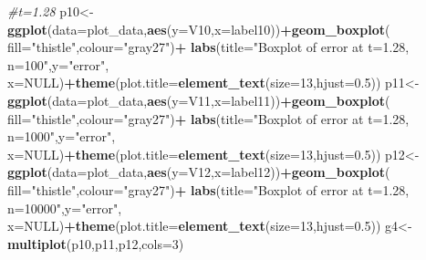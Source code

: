 \documentclass[
]{article}
\newenvironment{Shaded}{\begin{snugshade}}{\end{snugshade}}
\newcommand{\CommentTok}[1]{\textcolor[rgb]{0.56,0.35,0.01}{\textit{#1}}}
\newcommand{\DataTypeTok}[1]{\textcolor[rgb]{0.13,0.29,0.53}{#1}}
\newcommand{\DecValTok}[1]{\textcolor[rgb]{0.00,0.00,0.81}{#1}}
\newcommand{\FloatTok}[1]{\textcolor[rgb]{0.00,0.00,0.81}{#1}}
\newcommand{\KeywordTok}[1]{\textcolor[rgb]{0.13,0.29,0.53}{\textbf{#1}}}
\newcommand{\NormalTok}[1]{#1}
\newcommand{\OperatorTok}[1]{\textcolor[rgb]{0.81,0.36,0.00}{\textbf{#1}}}
\newcommand{\OtherTok}[1]{\textcolor[rgb]{0.56,0.35,0.01}{#1}}
\newcommand{\StringTok}[1]{\textcolor[rgb]{0.31,0.60,0.02}{#1}}
\begin{document}
\begin{Shaded}
\begin{Highlighting}[]
\CommentTok{#t=1.28}
\NormalTok{p10<-}\KeywordTok{ggplot}\NormalTok{(}\DataTypeTok{data=}\NormalTok{plot_data,}\KeywordTok{aes}\NormalTok{(}\DataTypeTok{y=}\NormalTok{V10,}\DataTypeTok{x=}\NormalTok{label10))}\OperatorTok{+}\KeywordTok{geom_boxplot}\NormalTok{(}
  \DataTypeTok{fill=}\StringTok{"thistle"}\NormalTok{,}\DataTypeTok{colour=}\StringTok{"gray27"}\NormalTok{)}\OperatorTok{+}
\StringTok{  }\KeywordTok{labs}\NormalTok{(}\DataTypeTok{title=}\StringTok{"Boxplot of error at t=1.28, n=100"}\NormalTok{,}\DataTypeTok{y=}\StringTok{"error"}\NormalTok{,}
       \DataTypeTok{x=}\OtherTok{NULL}\NormalTok{)}\OperatorTok{+}\KeywordTok{theme}\NormalTok{(}\DataTypeTok{plot.title=}\KeywordTok{element_text}\NormalTok{(}\DataTypeTok{size=}\DecValTok{13}\NormalTok{,}\DataTypeTok{hjust=}\FloatTok{0.5}\NormalTok{))}
\NormalTok{p11<-}\KeywordTok{ggplot}\NormalTok{(}\DataTypeTok{data=}\NormalTok{plot_data,}\KeywordTok{aes}\NormalTok{(}\DataTypeTok{y=}\NormalTok{V11,}\DataTypeTok{x=}\NormalTok{label11))}\OperatorTok{+}\KeywordTok{geom_boxplot}\NormalTok{(}
  \DataTypeTok{fill=}\StringTok{"thistle"}\NormalTok{,}\DataTypeTok{colour=}\StringTok{"gray27"}\NormalTok{)}\OperatorTok{+}
\StringTok{  }\KeywordTok{labs}\NormalTok{(}\DataTypeTok{title=}\StringTok{"Boxplot of error at t=1.28, n=1000"}\NormalTok{,}\DataTypeTok{y=}\StringTok{"error"}\NormalTok{,}
       \DataTypeTok{x=}\OtherTok{NULL}\NormalTok{)}\OperatorTok{+}\KeywordTok{theme}\NormalTok{(}\DataTypeTok{plot.title=}\KeywordTok{element_text}\NormalTok{(}\DataTypeTok{size=}\DecValTok{13}\NormalTok{,}\DataTypeTok{hjust=}\FloatTok{0.5}\NormalTok{))}
\NormalTok{p12<-}\KeywordTok{ggplot}\NormalTok{(}\DataTypeTok{data=}\NormalTok{plot_data,}\KeywordTok{aes}\NormalTok{(}\DataTypeTok{y=}\NormalTok{V12,}\DataTypeTok{x=}\NormalTok{label12))}\OperatorTok{+}\KeywordTok{geom_boxplot}\NormalTok{(}
  \DataTypeTok{fill=}\StringTok{"thistle"}\NormalTok{,}\DataTypeTok{colour=}\StringTok{"gray27"}\NormalTok{)}\OperatorTok{+}
\StringTok{  }\KeywordTok{labs}\NormalTok{(}\DataTypeTok{title=}\StringTok{"Boxplot of error at t=1.28, n=10000"}\NormalTok{,}\DataTypeTok{y=}\StringTok{"error"}\NormalTok{,}
       \DataTypeTok{x=}\OtherTok{NULL}\NormalTok{)}\OperatorTok{+}\KeywordTok{theme}\NormalTok{(}\DataTypeTok{plot.title=}\KeywordTok{element_text}\NormalTok{(}\DataTypeTok{size=}\DecValTok{13}\NormalTok{,}\DataTypeTok{hjust=}\FloatTok{0.5}\NormalTok{))}
\NormalTok{g4<-}\KeywordTok{multiplot}\NormalTok{(p10,p11,p12,}\DataTypeTok{cols=}\DecValTok{3}\NormalTok{)}


\end{Highlighting}
\end{Shaded}
\end{document}
